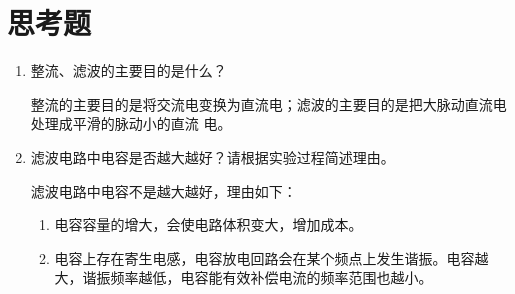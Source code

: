 \documentclass{article}
\begin{document}
\section*{思考题}
\begin{enumerate}
    \item 整流、滤波的主要目的是什么？

          整流的主要目的是将交流电变换为直流电；滤波的主要目的是把大脉动直流电处理成平滑的脉动小的直流
          电。

    \item  滤波电路中电容是否越大越好？请根据实验过程简述理由。

          滤波电路中电容不是越大越好，理由如下：
          \begin{enumerate}
              \item 电容容量的增大，会使电路体积变大，增加成本。
              \item 电容上存在寄生电感，电容放电回路会在某个频点上发生谐振。电容越大，谐振频率越低，电容能有效补偿电流的频率范围也越小。
          \end{enumerate}


\end{enumerate}
\end{document}
